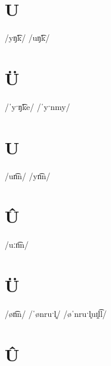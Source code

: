 \documentclass[10pt,a4paper,twoside]{book}
\begin{document}
\section*{U}

\begin{multicols}{3}
 {/yŋ͡k/} {}
 {/uŋ͡k/} {}
\end{multicols}

\section*{Ü}

\begin{multicols}{3}
 {/ˈyˑŋ͡ke/} {}
 {/ˈyˑnmy/} {}
\end{multicols}

\section*{U}

\begin{multicols}{3}
 {/un͡n/} {}
 {/yn͡n/} {}
\end{multicols}

\section*{Û}

\begin{multicols}{3}
 {/uːn͡n/} {}
\end{multicols}

\section*{Ü}

\begin{multicols}{3}
 {/øn͡n/} {}
 {/ˈønruˑl̥/} {}
 {/øˈnruˑl̥uɪ̯l͡l/} {}
\end{multicols}

\section*{Û}
\end{document}

